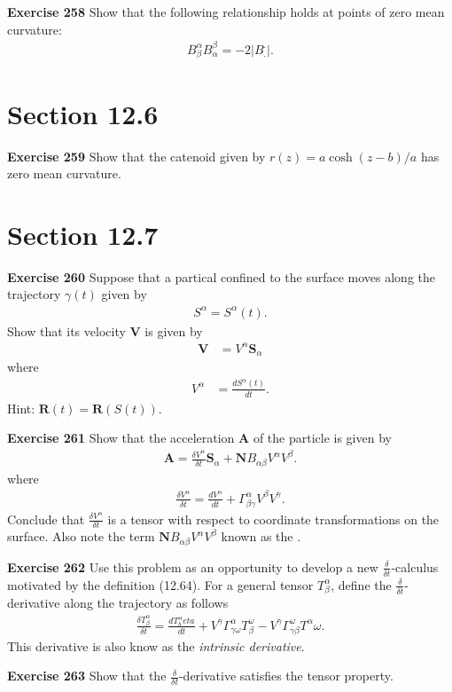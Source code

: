 \documentclass[12pt,a4paper]{report}
\begin{document}
\begin{description}
\item \textbf{Exercise 258} Show that  the following relationship holds at points of zero mean curvature:
\begin{align*}
	B^\alpha_\beta B^\beta_\alpha = -2 |B^._.|.
\end{align*}

\section*{Section 12.6}
\item \textbf{Exercise 259} Show that the catenoid given by $r(z) = a \cosh(z-b)/a$ has zero mean curvature.

\section*{Section 12.7}
\item \textbf{Exercise 260} Suppose that a partical confined to the surface moves along the trajectory $\gamma(t)$ given by 
\begin{align*}
	S^\alpha = S^\alpha(t).
\end{align*}Show that its velocity $\textbf{V}$ is given by 
\begin{align*}
	\textbf{V} &= V^\alpha \textbf{S}_\alpha
\end{align*}where
\begin{align*}
	V^\alpha &= \frac{dS^\alpha(t)}{dt}.
\end{align*}Hint: $\textbf{R}(t) = \textbf{R}(S(t))$.

\newcommand{\NPART}[2]{\frac{\delta #1}{\delta #2}}
\item \textbf{Exercise 261} Show that the acceleration $\textbf{A}$ of the particle is given by 
\begin{align*}
	\textbf{A} = \NPART{V^\alpha}{t} \textbf{S}_\alpha + \textbf{N} B_{\alpha\beta}V^\alpha V^\beta.
\end{align*}where
\begin{align*}
	\NPART{V^\alpha}{t} = \frac{d V^\alpha}{dt} + \Gamma^\alpha_{\beta\gamma} V^\beta V^\gamma.
\end{align*}Conclude that $\NPART{V^\alpha}{t}$ is a tensor with respect to coordinate transformations on the surface.  Also note the term $\textbf{N} B_{\alpha\beta}V^\alpha V^\beta$ known as the .

\item \textbf{Exercise 262} Use this problem as an opportunity to develop a new $\NPART{}{t}$-calculus motivated by the definition (12.64).  For a general tensor $T^\alpha_\beta$, define the $\NPART{}{t}$-derivative along the trajectory as follows
\begin{align*}
	\NPART{T^\alpha_\beta}{t} = \frac{d T^\alpha_beta}{dt} + V^\gamma\Gamma^\alpha_{\gamma\omega}T^\omega_\beta - V^\gamma\Gamma^\omega_{\gamma\beta}T^\alpha\omega.
\end{align*}This derivative is also know as the \textit{intrinsic derivative}.
\item \textbf{Exercise 263} Show that the $\NPART{}{t}$-derivative satisfies the tensor property.


\end{description}
\end{document}
